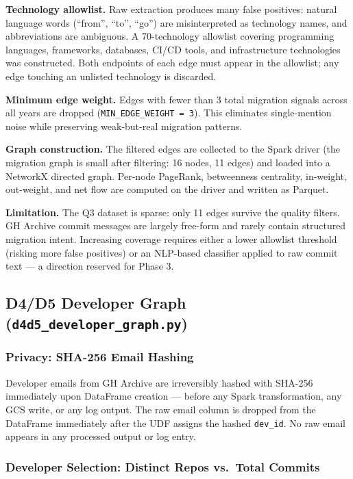 \documentclass[conference]{IEEEtran}
\begin{document}
\textbf{Technology allowlist.} Raw extraction produces many false positives:
natural language words (``from'', ``to'', ``go'') are misinterpreted as
technology names, and abbreviations are ambiguous. A 70-technology allowlist
covering programming languages, frameworks, databases, CI/CD tools, and
infrastructure technologies was constructed. Both endpoints of each edge
must appear in the allowlist; any edge touching an unlisted technology is
discarded.

\textbf{Minimum edge weight.} Edges with fewer than 3 total migration signals
across all years are dropped (\texttt{MIN\_EDGE\_WEIGHT = 3}). This eliminates
single-mention noise while preserving weak-but-real migration patterns.

\textbf{Graph construction.} The filtered edges are collected to the Spark
driver (the migration graph is small after filtering: 16 nodes, 11 edges)
and loaded into a NetworkX directed graph. Per-node PageRank, betweenness
centrality, in-weight, out-weight, and net flow are computed on the driver
and written as Parquet.

\textbf{Limitation.} The Q3 dataset is sparse: only 11 edges survive the
quality filters. GH Archive commit messages are largely free-form and
rarely contain structured migration intent. Increasing coverage requires
either a lower allowlist threshold (risking more false positives) or an
NLP-based classifier applied to raw commit text — a direction reserved for
Phase 3.

\subsection{D4/D5 Developer Graph (\texttt{d4d5\_developer\_graph.py})}

\subsubsection{Privacy: SHA-256 Email Hashing}

Developer emails from GH Archive are irreversibly hashed with SHA-256
immediately upon DataFrame creation — before any Spark transformation,
any GCS write, or any log output. The raw email column is dropped from
the DataFrame immediately after the UDF assigns the hashed \texttt{dev\_id}.
No raw email appears in any processed output or log entry.

\subsubsection{Developer Selection: Distinct Repos vs.\ Total Commits}
\end{document}
